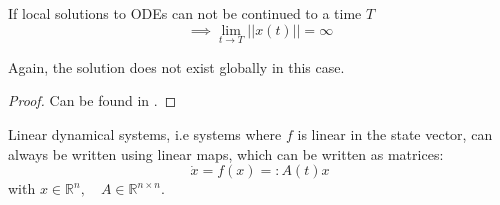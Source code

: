 \begin{framed}
\begin{theorem}
    \label{continuationthm}
    If local solutions to ODEs can not be continued to a time $T$
    $$\implies \lim_{t\rightarrow T} ||x(t)|| = \infty $$
\end{theorem}
\end{framed}
Again, the solution does not exist globally in this case.
\begin{proof}
    Can be found in \cite{arnoldODE}.
\end{proof}

Linear dynamical systems, i.e systems where $f$ is linear in the state vector, can always be written using linear maps, which can be written as matrices:
\begin{equation}
    \dot x = f(x) =: A(t) x
\end{equation}
with $x \in\mathbb{R}^n, \quad A\in \mathbb{R}^{n\times n}$.

